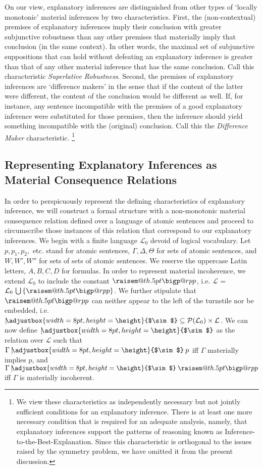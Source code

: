 \documentclass{svjour3}                     %
\makeatletter
\newcommand{\raisemath}[1]{\mathpalette{\raisem@th{#1}}}
\newcommand{\raisem@th}[3]{\raisebox{#1}{$#2#3$}}
\newcommand{\bigperpp}{%
  \mathop{\mathpalette\bigp@rpp\relax}%
  \displaylimits
}
\newcommand{\bigp@rpp}[2]{%
  \vcenter{
    \m@th\hbox{\scalebox{\ifx#1\displaystyle1.3\else1.3\fi}{$#1\perp$}}
  }%
}
\newcommand{\bigperp}{\raisemath{.5pt}{\bigperpp}}
\newcommand{\ssim}{%
     \setbox0=\hbox{$\sim$}%
     \adjustbox{width=8pt,height=\height}{$\sim$}
}
\newcommand{\nmc}{\mathbin{\mid\joinrel\!\!\ssim}}
\makeatother
\begin{document}
On our view, explanatory inferences are distinguished from other types of `locally monotonic' material inferences by two characteristics. First, the (non-contextual) premises of explanatory inferences imply their conclusion with greater subjunctive robustness than any other premises that materially imply that conclusion (in the same context). In other words, the maximal set of subjunctive suppositions that can hold without defeating an explanatory inference is greater than that of any other material inference that has the same conclusion. Call this characteristic \textit{Superlative Robustness}. Second, the premises of explanatory inferences are `difference makers' in the sense that if the content of the latter were different, the content of the conclusion would be different as well. If, for instance, any sentence incompatible with the premises of a good explanatory inference were substituted for those premises, then the inference should yield something incompatible with the (original) conclusion.   Call this the \textit{Difference Maker} characteristic. \footnote{We view these characteristics as independently necessary but not jointly sufficient conditions for an explanatory inference. There is at least one more necessary condition that is required for an adequate analysis, namely, that explanatory inferences support the patterns of reasoning  known as Inference-to-the-Best-Explanation. Since this characteristic is orthogonal to the issues raised by the symmetry problem, we have omitted it from the present discussion.} 

\subsection{Representing Explanatory Inferences as Material Consequence Relations}

In order to perspicuously represent the defining characteristics of explanatory inference, we will construct a formal structure with a non-monotonic material consequence relation defined over a language of atomic sentences and proceed to circumscribe those instances of this relation that correspond to our explanatory inferences. We begin with a finite language $ \mathcal{L}_{0} $ devoid of logical vocabulary. Let $ p, p_1, p_2, $ etc. stand for atomic sentences, $ \Gamma, \Delta, \Theta $ for sets of atomic sentences, and $ W, W',W'' $ for sets of sets of atomic sentences. We reserve the uppercase Latin letters, $ A, B, C, D $ for formulas. In order to represent material incoherence, we extend $ \mathcal{L}_0 $ to include the constant $ \bigperp $, i.e. $ \mathcal{L} $ = $ \mathcal{L}_0 \,\bigcup \,\{\bigperp\}$. We further stipulate that $ \bigperp $ can neither appear to the left of the turnstile nor be embedded, i.e. $ {\nmc} \subseteq \mathcal{P}(\mathcal{L}_0) \times \mathcal{L} $. We can now define $ \nmc $ as the relation over $ \mathcal{L} $ such that $  \Gamma\nmc p $ iff  $\Gamma$ materially implies $ p $, and $\Gamma\nmc \bigperp $ iff $ \Gamma $ is materially incoherent. 
\end{document}
